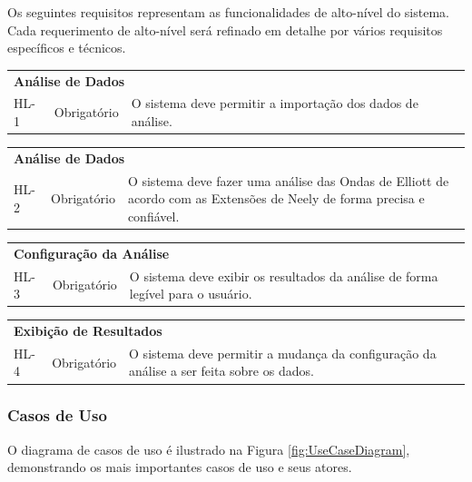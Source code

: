 \documentclass[12pt]{article}
\begin{document}
Os seguintes requisitos representam as funcionalidades de alto-nível do sistema.
Cada requerimento de alto-nível será refinado em detalhe por vários requisitos específicos
e técnicos.

\begingroup
\renewcommand*{\arraystretch}{1.5}

\centering

\begin{tabular}{|p{1cm} p{2cm} p{9cm}|}
	\hline
	\multicolumn{3}{|l|}{\textbf{Análise de Dados}}\\
	HL-1 & Obrigatório & O sistema deve permitir a importação dos dados de análise.\\
	\hline
\end{tabular}

\begin{tabular}{|p{1cm} p{2cm} p{9cm}|}
	\hline
	\multicolumn{3}{|l|}{\textbf{Análise de Dados}}\\
	HL-2 & Obrigatório & O sistema deve fazer uma análise das Ondas de Elliott de acordo com as
						 Extensões de Neely de forma precisa e confiável.\\
	\hline
\end{tabular}

\begin{tabular}{|p{1cm} p{2cm} p{9cm}|}
	\hline
	\multicolumn{3}{|l|}{\textbf{Configuração da Análise}}\\
	HL-3 & Obrigatório & O sistema deve exibir os resultados da análise de forma legível para
						 o usuário.\\
	\hline
\end{tabular}

\begin{tabular}{|p{1cm} p{2cm} p{9cm}|}
	\hline
	\multicolumn{3}{|l|}{\textbf{Exibição de Resultados}}\\
	HL-4 & Obrigatório & O sistema deve permitir a mudança da configuração da análise a ser
						 feita sobre os dados.\\
	\hline
\end{tabular}

\endgroup

\subsubsection{Casos de Uso}\label{sec:UseCases}

O diagrama de casos de uso é ilustrado na Figura \ref{fig:UseCaseDiagram}, demonstrando os mais
importantes casos de uso e seus atores.
\end{document}
